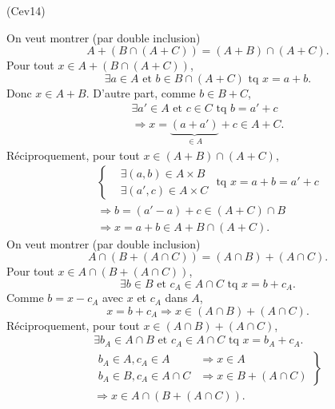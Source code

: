 \begin{tiny}(Cev14)\end{tiny} On veut montrer (par double inclusion) 
\[ 
A+\left( B\cap(A+C)\right) = (A+B)\cap(A+C) . 
\]
Pour tout $x \in A+\left( B\cap(A+C)\right)$,
\[
 \exists a \in A \text{ et } b \in B\cap(A + C) \text{ tq } x = a + b.
\]
Donc $x \in A + B$. D'autre part, comme $b \in B + C$,
\begin{multline*}
  \exists a' \in A\text{ et } c \in C \text{ tq } b = a' + c \\
  \Rightarrow x = \underset{\in A }{\underbrace{(a + a')}} + c \in A + C . 
\end{multline*}
Réciproquement, pour tout $x \in (A+B) \cap (A+C)$,
\begin{multline*}
  \left\lbrace
  \begin{aligned}
    &\exists (a,b) \in A\times B \\
    &\exists (a',c) \in A\times C 
  \end{aligned}
\right.
\text{ tq } x = a+b = a' + c\\
\Rightarrow b = (a' - a) + c \in (A + C)\cap B \\
\Rightarrow x = a + b \in A + B\cap (A + C).
\end{multline*}
On veut montrer (par double inclusion) 
\[ 
A\cap \left( B+(A\cap C)\right) = (A\cap B)+(A\cap C). 
\]
Pour tout $x \in A\cap \left( B+(A\cap C)\right)$,
\[
  \exists b \in B \text{ et } c_A \in A\cap C \text{ tq } x = b + c_A.
\]
Comme $b = x - c_A$ avec $x$ et $c_A$ dans $A$, 
\[
  x = b + c_A \Rightarrow x \in (A\cap B) + (A \cap C).
\]
Réciproquement, pour tout $x \in (A\cap B)+(A\cap C)$,
\begin{multline*}
  \exists b_A \in A\cap B \text{ et } c_A \in A\cap C \text{ tq }
  x = b_A + c_A.\\
\left.
\begin{aligned}
  b_A \in A, c_A \in A &\Rightarrow x \in A \\
  b_A \in B, c_A \in A \cap C &\Rightarrow x \in B + (A \cap C)
\end{aligned} 
\right\rbrace\\
\Rightarrow x \in A \cap ( B + (A \cap C)).
\end{multline*}
